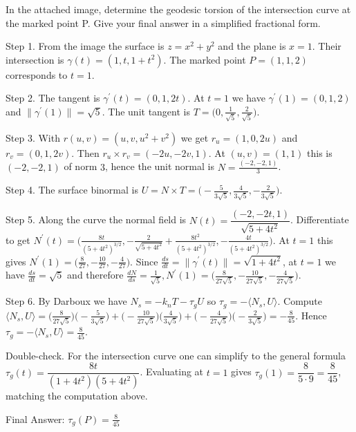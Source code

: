 In the attached image, determine the geodesic torsion of the intersection curve at the marked point P. Give your final answer in a simplified fractional form.


Step 1. From the image the surface is $z=x^{2}+y^{2}$ and the plane is $x=1$. Their intersection is $\gamma(t)=(1,t,1+t^{2})$. The marked point $P=(1,1,2)$ corresponds to $t=1$.

Step 2. The tangent is $\gamma^{\prime}(t)=(0,1,2t)$. At $t=1$ we have $\gamma^{\prime}(1)=(0,1,2)$ and $\lVert\gamma^{\prime}(1)\rVert=\sqrt{5}$. The unit tangent is $T=\bigl(0,\tfrac{1}{\sqrt{5}},\tfrac{2}{\sqrt{5}}\bigr)$.

Step 3. With $r(u,v)=(u,v,u^{2}+v^{2})$ we get $r_{u}=(1,0,2u)$ and $r_{v}=(0,1,2v)$. Then $r_{u}\times r_{v}=(-2u,-2v,1)$. At $(u,v)=(1,1)$ this is $(-2,-2,1)$ of norm $3$, hence the unit normal is $N=\frac{(-2,-2,1)}{3}$.

Step 4. The surface binormal is $U=N\times T=\bigl(-\tfrac{5}{3\sqrt{5}},\tfrac{4}{3\sqrt{5}},-\tfrac{2}{3\sqrt{5}}\bigr)$.

Step 5. Along the curve the normal field is $N(t)=\dfrac{(-2,-2t,1)}{\sqrt{5+4t^{2}}}$. Differentiate to get $N^{\prime}(t)=\bigl(\tfrac{8t}{(5+4t^{2})^{3/2}},-\tfrac{2}{\sqrt{5+4t^{2}}}+\tfrac{8t^{2}}{(5+4t^{2})^{3/2}},-\tfrac{4t}{(5+4t^{2})^{3/2}}\bigr)$. At $t=1$ this gives $N^{\prime}(1)=\bigl(\tfrac{8}{27},-\tfrac{10}{27},-\tfrac{4}{27}\bigr)$. Since $\tfrac{ds}{dt}=\lVert\gamma^{\prime}(t)\rVert=\sqrt{1+4t^{2}}$, at $t=1$ we have $\tfrac{ds}{dt}=\sqrt{5}$ and therefore $\tfrac{dN}{ds}=\tfrac{1}{\sqrt{5}},N^{\prime}(1)=\bigl(\tfrac{8}{27\sqrt{5}},-\tfrac{10}{27\sqrt{5}},-\tfrac{4}{27\sqrt{5}}\bigr)$.

Step 6. By Darboux we have $N_{s}=-k_{n}T-\tau_{g}U$ so $\tau_{g}=-\langle N_{s},U\rangle$. Compute $\langle N_{s},U\rangle=\bigl(\tfrac{8}{27\sqrt{5}}\bigr)\bigl(-\tfrac{5}{3\sqrt{5}}\bigr)+\bigl(-\tfrac{10}{27\sqrt{5}}\bigr)\bigl(\tfrac{4}{3\sqrt{5}}\bigr)+\bigl(-\tfrac{4}{27\sqrt{5}}\bigr)\bigl(-\tfrac{2}{3\sqrt{5}}\bigr)=-\tfrac{8}{45}$. Hence $\tau_{g}=-\langle N_{s},U\rangle=\tfrac{8}{45}$.

Double-check. For the intersection curve one can simplify to the general formula $\tau_{g}(t)=\dfrac{8t}{(1+4t^{2})(5+4t^{2})}$. Evaluating at $t=1$ gives $\tau_{g}(1)=\dfrac{8}{5\cdot 9}=\dfrac{8}{45}$, matching the computation above.

Final Answer: $\tau_{g}(P)=\tfrac{8}{45}$